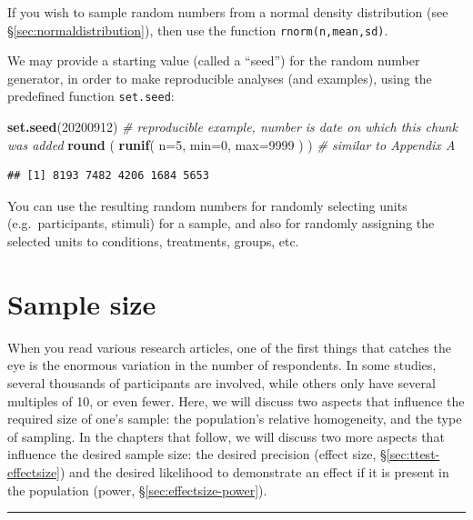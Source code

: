 \documentclass[
]{book}
\newenvironment{Shaded}{\begin{snugshade}}{\end{snugshade}}
\newcommand{\CommentTok}[1]{\textcolor[rgb]{0.56,0.35,0.01}{\textit{#1}}}
\newcommand{\DataTypeTok}[1]{\textcolor[rgb]{0.13,0.29,0.53}{#1}}
\newcommand{\DecValTok}[1]{\textcolor[rgb]{0.00,0.00,0.81}{#1}}
\newcommand{\KeywordTok}[1]{\textcolor[rgb]{0.13,0.29,0.53}{\textbf{#1}}}
\newcommand{\NormalTok}[1]{#1}
\begin{document}
If you wish to sample random numbers from a normal density distribution (see §\ref{sec:normaldistribution}), then use the function \texttt{rnorm(n,mean,sd)}.

We may provide a starting value (called a ``seed'') for the random number generator, in order to make reproducible analyses (and examples), using the predefined function \texttt{set.seed}:

\begin{Shaded}
\begin{Highlighting}[]
\KeywordTok{set.seed}\NormalTok{(}\DecValTok{20200912}\NormalTok{) }\CommentTok{\# reproducible example, number is date on which this chunk was added}
\KeywordTok{round}\NormalTok{ ( }\KeywordTok{runif}\NormalTok{( }\DataTypeTok{n=}\DecValTok{5}\NormalTok{, }\DataTypeTok{min=}\DecValTok{0}\NormalTok{, }\DataTypeTok{max=}\DecValTok{9999}\NormalTok{ ) ) }\CommentTok{\# similar to Appendix A}
\end{Highlighting}
\end{Shaded}

\begin{verbatim}
## [1] 8193 7482 4206 1684 5653
\end{verbatim}

You can use the resulting random numbers for randomly selecting units (e.g.~participants, stimuli) for a sample, and also for randomly assigning the selected units to conditions, treatments, groups, etc.

\hypertarget{sec:sample-size}{%
\section{Sample size}\label{sec:sample-size}}

When you read various research articles, one of the first things that catches the eye is the enormous variation in the number of respondents. In some studies, several thousands of participants are involved, while others only have several multiples of 10, or even fewer. Here, we will discuss two aspects that influence the required size of one's sample: the population's relative homogeneity, and the type of sampling. In the chapters that follow, we will discuss two more aspects that influence the desired sample size: the desired precision (effect size, §\ref{sec:ttest-effectsize}) and the desired likelihood to demonstrate an effect if it is present in the population (power, §\ref{sec:effectsize-power}).

\begin{center}\rule{0.5\linewidth}{0.5pt}\end{center}
\end{document}
